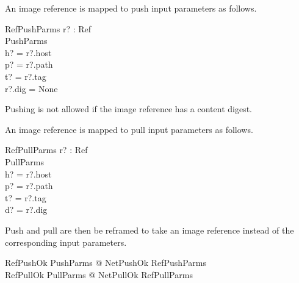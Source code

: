 \documentclass[a4paper,twoside,12pt]{article}
\begin{document}
An image reference is mapped to push input parameters as follows.
\begin{schema}{RefPushParms}
    r? : Ref \\
    PushParms \\
\where
    h? = r?.host \\
    p? = r?.path \\
    t? = r?.tag \\
    r?.dig = None \\
\end{schema}
Pushing is not allowed if the image reference has a content digest.

An image reference is mapped to pull input parameters as follows.
\begin{schema}{RefPullParms}
    r? : Ref \\
    PullParms \\
\where
    h? = r?.host \\
    p? = r?.path \\
    t? = r?.tag \\
    d? = r?.dig \\
\end{schema}

Push and pull are then be reframed to take an image reference instead of the corresponding input parameters.
\begin{zed}
  RefPushOk  \exists PushParms @ NetPushOk \land RefPushParms \\
  RefPullOk  \exists PullParms @ NetPullOk \land RefPullParms \\
\end{zed}



\clearpage

\appendix
\end{document}
